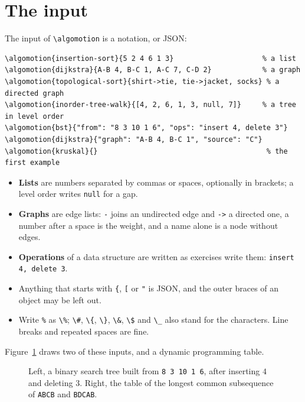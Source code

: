 \documentclass[11pt]{article}
\newcommand\cs[1]{\texttt{\textbackslash#1}}
\begin{document}
\section{The input}\label{sec:input}

The input of \cs{algomotion} is a notation, or JSON:

\begin{lstlisting}
\algomotion{insertion-sort}{5 2 4 6 1 3}                     % a list
\algomotion{dijkstra}{A-B 4, B-C 1, A-C 7, C-D 2}            % a graph
\algomotion{topological-sort}{shirt->tie, tie->jacket, socks} % a directed graph
\algomotion{inorder-tree-walk}{[4, 2, 6, 1, 3, null, 7]}     % a tree in level order
\algomotion{bst}{"from": "8 3 10 1 6", "ops": "insert 4, delete 3"}
\algomotion{dijkstra}{"graph": "A-B 4, B-C 1", "source": "C"}
\algomotion{kruskal}{}                                        % the first example
\end{lstlisting}

\begin{itemize}
  \item \textbf{Lists} are numbers separated by commas or spaces, optionally
    in brackets; a level order writes \texttt{null} for a gap.
  \item \textbf{Graphs} are edge lists: \texttt{-} joins an undirected edge
    and \texttt{->} a directed one, a number after a space is the weight, and
    a name alone is a node without edges.
  \item \textbf{Operations} of a data structure are written as exercises
    write them: \texttt{insert 4, delete 3}.
  \item Anything that starts with \texttt{\{}, \texttt{[} or \texttt{"} is
    JSON, and the outer braces of an object may be left out.
  \item Write \texttt{\%} as \texttt{\textbackslash\%}; \texttt{\textbackslash\#},
    \texttt{\textbackslash\{}, \texttt{\textbackslash\}}, \texttt{\textbackslash\&},
    \texttt{\textbackslash\$} and \texttt{\textbackslash\_} also stand for
    the characters. Line breaks and repeated spaces are fine.
\end{itemize}

\noindent Figure~\ref{fig:inputs} draws two of these inputs, and a dynamic
programming table.

\begin{figure}[htbp]
  \centering
  \begin{minipage}[c]{0.4\linewidth}
    \centering
  \end{minipage}\hfill
  \begin{minipage}[c]{0.55\linewidth}
    \centering
  \end{minipage}
  \caption{Left, a binary search tree built from \texttt{8 3 10 1 6}, after
    inserting $4$ and deleting $3$. Right, the table of the longest common
    subsequence of \texttt{ABCB} and \texttt{BDCAB}.}
  \label{fig:inputs}
\end{figure}
\end{document}
